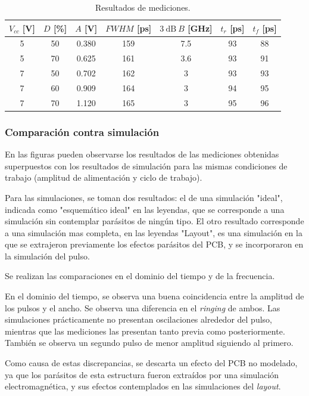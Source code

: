 \begin{table}
\centering
\begin{tabular}{ccccccc}
\hline
$V_{cc}$ [\unit{\volt}] & $D$ [\unit{\percent}] & $A$ [\unit{\volt}] &
    $FWHM$ [\unit{\pico\second}] & $\qty{3}{\dB} \ B$ [\unit{\giga\hertz}]& $t_r$
    [\unit{\pico\second}]& $t_f$ [\unit{\pico\second}]\\
\hline
5 & 50 & 0.380 & 159 & 7.5 & 93 & 88 \\
5 & 70 & 0.625 & 161 & 3.6 & 93 & 91 \\
7 & 50 & 0.702 & 162 & 3 & 93 & 93 \\
7 & 60 & 0.909 & 164 & 3 & 94 & 95 \\
7 & 70 & 1.120 & 165 & 3 & 95 & 96 \\
\hline
\end{tabular}
\caption{Resultados de mediciones.}
\label{tab:mediciones_resultados}
\end{table}

\subsubsection{Comparación contra simulación}

En las figuras pueden observarse los resultados de las mediciones obtenidas
superpuestos con los resultados de simulación para las mismas condiciones de
trabajo (amplitud de alimentación y ciclo de trabajo).

Para las simulaciones, se toman dos resultados: el de una simulación "ideal", 
indicada como "esquemático ideal" en las leyendas, que se corresponde a una simulación
sin contemplar parásitos de ningún tipo. El otro resultado corresponde a una simulación
mas completa, en las leyendas "Layout", es una simulación en la que se extrajeron
previamente los efectos parásitos del PCB, y se incorporaron en la simulación
del pulso.

Se realizan las comparaciones en el dominio del tiempo y de la frecuencia.

En el dominio del tiempo, se observa una buena coincidencia entre la amplitud
de los pulsos y el ancho. Se observa una diferencia en el \textit{ringing} de ambos.
Las simulaciones prácticamente no presentan oscilaciones alrededor del pulso,
mientras que las mediciones las presentan tanto previa como posteriormente.
También se observa un segundo pulso de menor amplitud siguiendo al primero.

Como causa de estas discrepancias, se descarta un efecto del PCB no modelado, 
ya que los parásitos de esta estructura fueron extraídos por una simulación 
electromagnética, y sus efectos contemplados en las simulaciones del \textit{layout}.


